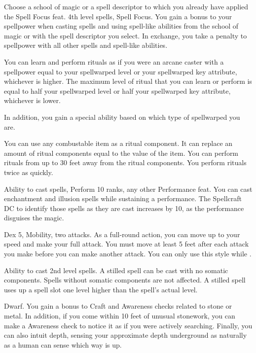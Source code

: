 Choose a school of magic or a spell descriptor to which you already have applied the Spell Focus feat.
\featpres 4th level spells, Spell Focus.
\featben You gain a  bonus to your spellpower when casting spells and using spell-like abilities from the school of magic or with the spell descriptor you select.
In exchange, you take a  penalty to spellpower with all other spells and spell-like abilities.

\featben You can learn and perform rituals as if you were an arcane caster with a spellpower equal to your spellwarped level or your spellwarped key attribute, whichever is higher.
The maximum level of ritual that you can learn or perform is equal to half your spellwarped level or half your spellwarped key attribute, whichever is lower.

In addition, you gain a special ability based on which type of spellwarped you are.

 \x
{}
You can use any combustable item as a ritual component.
It can replace an amount of ritual components equal to the value of the item.
You can perform rituals from up to 30 feet away from the ritual components.
You perform rituals twice as quickly.

\featpres Ability to cast spells, Perform 10 ranks, any other Performance feat.
\featben You can cast enchantment and illusion spells while sustaining a performance.
The Spellcraft DC to identify those spells as they are cast increases by 10, as the performance disguises the magic.

\featpres Dex 5, Mobility, two attacks.
\featben As a full-round action, you can move up to your speed and make your full attack.
You must move at least 5 feet after each attack you make before you can make another attack.
You can only use this style while \unencumbered.

\featpre Ability to cast 2nd level spells.
\featben A stilled spell can be cast with no somatic components.
Spells without somatic components are not affected.
A stilled spell uses up a spell slot one level higher than the spell's actual level.

\featpre Dwarf.
\featben You gain a  bonus to Craft and Awareness checks related to stone or metal.
In addition, if you come within 10 feet of unusual stonework, you can make a Awareness check to notice it as if you were actively searching.
Finally, you can also intuit depth, sensing your approximate depth underground as naturally as a human can sense which way is up.

